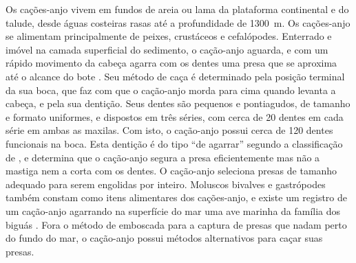 \documentclass[a4paper,11pt,twoside,showtrims,onecolumn,openright,final]{memoir}
\begin{document}
Os cações-anjo vivem em fundos de areia ou lama da plataforma continental e do talude, 
desde águas costeiras rasas até a profundidade de 1300~m. Os cações-anjo se alimentam 
principalmente de peixes, crustáceos e  cefalópodes. Enterrado e imóvel na camada superficial 
do sedimento, o cação-anjo aguarda, e com um rápido movimento da cabeça agarra com os dentes 
uma presa que se aproxima até o alcance do bote \citep{bigelow1948,COMPAGNO1984A}. %
Seu método de caça é determinado pela posição terminal da  sua boca, que faz com que o 
cação-anjo morda para cima quando levanta a cabeça, e pela sua dentição. 
Seus dentes são pequenos e pontiagudos, de tamanho e formato uniformes, e dispostos em três séries, 
com cerca de 20 dentes em cada série em ambas as maxilas. Com isto, o cação-anjo possui 
cerca de 120 dentes funcionais na boca. Esta dentição é do 
tipo ``de agarrar'' segundo a classificação de \citet{cappetta1986}, %
e determina que o cação-anjo segura a presa eficientemente mas não a mastiga nem 
a corta com os dentes. O cação-anjo seleciona presas de tamanho adequado para serem engolidas 
por inteiro. Moluscos bivalves e gastrópodes também constam como itens alimentares dos cações-anjo, 
e existe um registro de um cação-anjo agarrando na superfície do mar uma ave 
marinha da família dos biguás \citep{bigelow1948,COMPAGNO1984A}. %
Fora o método de emboscada para a captura de presas que nadam perto do fundo do mar, 
o cação-anjo possui métodos alternativos para caçar suas presas. 
\end{document}
